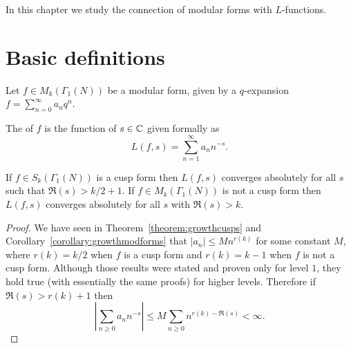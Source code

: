 In this chapter we study the connection of modular forms with $L$-functions.

\section{Basic definitions}
\label{sec:levelone}

Let $f\in M_k(\Gamma_1(N))$ be a modular form, given by a $q$-expansion $f=\sum_{n=0}^\infty a_nq^n$.

\begin{definition}
  The  of $f$ is the function of $s\in\mathbb{C}$ given formally as
\[
L(f,s)=\sum_{n=1}^\infty a_n n^{-s}.
\]
\end{definition}

\begin{proposition}
  If $f\in S_k(\Gamma_1(N))$ is a cusp form then $L(f,s)$ converges absolutely for all $s$ such that $\Re(s)>k/2+1$. If $f\in M_k(\Gamma_1(N))$ is not a cusp form then $L(f,s)$ converges absolutely for all $s$ with $\Re(s)>k$.
\end{proposition}
\begin{proof}
  We have seen in Theorem~\ref{theorem:growthcusps} and Corollary~\ref{corollary:growthmodforms} that $|a_n|\leq Mn^{r(k)}$ for some constant $M$, where $r(k)=k/2$ when $f$ is a cusp form and $r(k)=k-1$ when $f$ is not a cusp form. Although those results were stated and proven only for level $1$, they hold true (with essentially the same proofs) for higher levels. Therefore if $\Re(s)>r(k)+1$ then
\[
|\sum_{n\geq 0} a_nn^{-s}|\leq M \sum_{n\geq 0} n^{r(k)-\Re(s)} < \infty.
\]
\end{proof}

